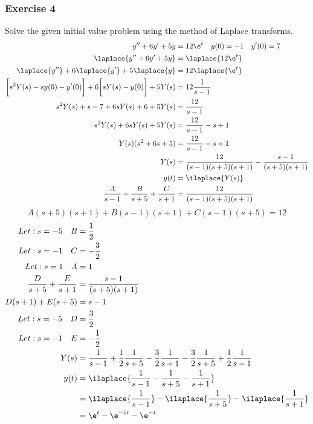 \documentclass{math}
\begin{document}
\subsubsection*{Exercise 4}
Solve the given initial value problem using the method of Laplace transforms.
\begin{align*}
  y''+6y'+5y &= 12\e^t \quad y(0) = -1 \quad y'(0) = 7 \\
  \laplace{y''+6y'+5y} &= \laplace{12\e^t} \\
  \laplace{y''}+6\laplace{y'}+5\laplace{y} &= 12\laplace{\e^t} \\
  \bigg[s^2Y(s)-sy(0)-y'(0)\bigg]+6\bigg[sY(s)-y(0)\bigg]+5Y(s) &=
    12\frac{1}{s-1} \\
  s^2Y(s)+s-7+6sY(s)+6+5Y(s) &= \frac{12}{s-1} \\
  s^2Y(s)+6sY(s)+5Y(s) &= \frac{12}{s-1}-s+1 \\
  Y(s)(s^2+6s+5) &= \frac{12}{s-1}-s+1 \\
  Y(s) &= \frac{12}{(s-1)(s+5)(s+1)}-\frac{s-1}{(s+5)(s+1)} \\
  y(t) &= \ilaplace{Y(s)} \\
  \frac{A}{s-1}+\frac{B}{s+5}+\frac{C}{s+1} &= \frac{12}{(s-1)(s+5)(s+1)}
\end{align*}
\[ A(s+5)(s+1)+B(s-1)(s+1)+C(s-1)(s+5) = 12 \]
\begin{align*}
  Let: s = -5 \quad B &= \frac{1}{2} \\
  Let: s = -1 \quad C &= -\frac{3}{2} \\
  Let: s = 1 \quad A &= 1 \\
  \frac{D}{s+5}+\frac{E}{s+1} &= \frac{s-1}{(s+5)(s+1)} \\
  D(s+1)+E(s+5) &= s-1 \\
  Let: s = -5 \quad D &= \frac{3}{2} \\
  Let: s = -1 \quad E &= -\frac{1}{2} \\
  Y(s) &= \frac{1}{s-1}+\frac{1}{2}\frac{1}{s+5}-\frac{3}{2}\frac{1}{s+1}
    -\frac{3}{2}\frac{1}{s+5}+\frac{1}{2}\frac{1}{s+1} \\
  y(t) &= \ilaplace{\frac{1}{s-1}-\frac{1}{s+5}-\frac{1}{s+1}} \\
  &= \ilaplace{\frac{1}{s-1}}-\ilaplace{\frac{1}{s+5}}-
    \ilaplace{\frac{1}{s+1}} \\
  &= \e^{t}-\e^{-5t}-\e^{-t}
\end{align*}
\end{document}
